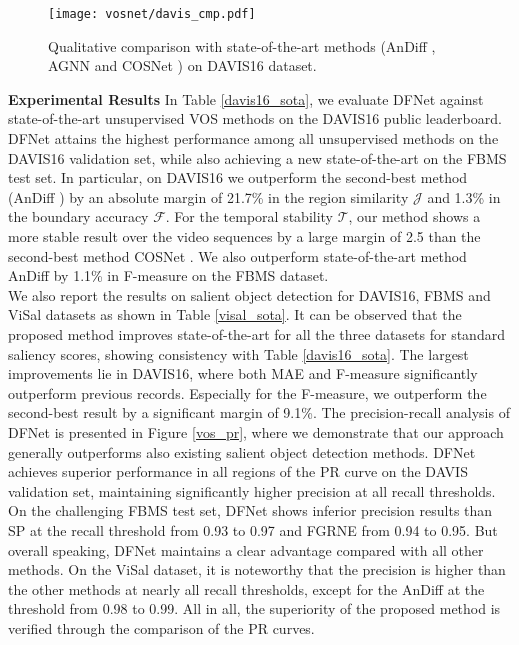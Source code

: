 \documentclass[runningheads]{llncs}
\begin{document}
\begin{figure*}[t!]
	\centering
	\texttt{[image: vosnet/davis\_cmp.pdf]}
	\caption{Qualitative comparison with state-of-the-art methods (AnDiff \cite{vos_andiff}, AGNN \cite{vos_agnn} and COSNet \cite{vos_cosnet}) on DAVIS16  dataset.   }
	\label{davis_cmp}
\end{figure*}
\noindent \textbf{Experimental Results } In Table \ref{davis16_sota}, we evaluate DFNet against state-of-the-art unsupervised VOS methods on the DAVIS16 public leaderboard. DFNet attains the highest performance among all unsupervised methods on the DAVIS16 validation set, while also achieving a new state-of-the-art on the FBMS test set. In particular, on DAVIS16 we outperform the second-best method (AnDiff \cite{vos_andiff}) by an absolute margin of 21.7\% in the  region similarity $\mathcal{J}$ and 1.3\% in the boundary accuracy $\mathcal{F}$. For the temporal stability $\mathcal{T}$, our method shows a more stable result over the video sequences by a large margin of 2.5  than the second-best method COSNet \cite{vos_cosnet}. We also outperform state-of-the-art method AnDiff \cite{vos_andiff} by 1.1\% in F-measure on the FBMS dataset.\\
\indent We also report the results on salient object detection for DAVIS16, FBMS and ViSal datasets as shown in Table \ref{visal_sota}. It can be observed that the proposed method improves state-of-the-art for all the three datasets for standard saliency scores, showing consistency with Table \ref{davis16_sota}. The largest improvements lie in DAVIS16, where both MAE and F-measure significantly outperform previous records. Especially for the F-measure, we outperform the second-best result by a significant margin of 9.1\%. The precision-recall analysis of DFNet is presented in Figure \ref{vos_pr}, where we demonstrate that our approach generally outperforms also existing salient object detection methods.
DFNet achieves superior performance in all regions of the PR curve on the DAVIS validation set, maintaining significantly higher precision at all recall thresholds. On the challenging FBMS test set, DFNet shows  inferior precision results than SP \cite{video_sp}at the recall threshold from 0.93 to 0.97 and FGRNE \cite{video_fgrne} from 0.94 to 0.95. But overall speaking,  DFNet maintains a clear advantage compared with all other methods. 
On the ViSal dataset, it is noteworthy that the precision is higher than the other methods at nearly all recall thresholds, except for the AnDiff \cite{vos_andiff} at the threshold from 0.98 to 0.99. All in all, the superiority of the proposed method is verified through the comparison of the PR curves.\\
\end{document}
